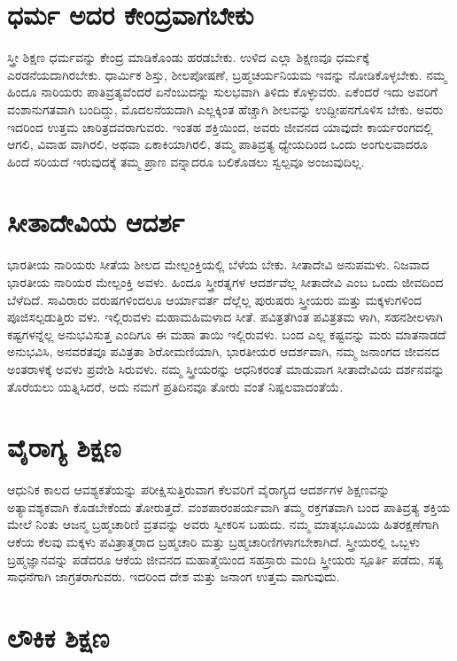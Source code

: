 \section{ಧರ್ಮ ಅದರ ಕೇಂದ್ರವಾಗಬೇಕು}

ಸ್ತ್ರೀ ಶಿಕ್ಷಣ ಧರ್ಮವನ್ನು ಕೇಂದ್ರ ಮಾಡಿಕೊಂಡು ಹರಡಬೇಕು. ಉಳಿದ ಎಲ್ಲಾ ಶಿಕ್ಷಣವೂ ಧರ್ಮಕ್ಕೆ ಎರಡನೆಯದಾಗಿರಬೇಕು. ಧಾರ್ಮಿಕ ಶಿಸ್ತು, ಶೀಲಪೋಷಣೆ, ಬ್ರಹ್ಮಚರ್ಯನಿಯಮ ಇವನ್ನು ನೋಡಿಕೊಳ್ಳಬೇಕು. ನಮ್ಮ ಹಿಂದೂ ನಾರಿಯರು ಪಾತಿವ್ರತ್ಯವೆಂದರೆ ಏನೆಂಬುದನ್ನು ಸುಲಭವಾಗಿ ತಿಳಿದು ಕೊಳ್ಳುವರು. ಏಕೆಂದರೆ ಇದು ಅವರಿಗೆ ವಂಶಾನುಗತವಾಗಿ ಬಂದಿದ್ದು, ಮೊದಲನೆಯದಾಗಿ ಎಲ್ಲಕ್ಕಿಂತ ಹೆಚ್ಚಾಗಿ ಶೀಲವನ್ನು ಉದ್ದೀಪನಗೊಳಿಸ ಬೇಕು. ಅವರು ಇದರಿಂದ ಉತ್ತಮ ಚಾರಿತ್ರದವರಾಗುವರು. ಇಂತಹ ಶಕ್ತಿಯಿಂದ, ಅವರು ಜೀವನದ ಯಾವುದೇ ಕಾರ್ಯರಂಗದಲ್ಲಿ ಆಗಲಿ, ವಿವಾಹ ವಾಗಿರಲಿ, ಅಥವಾ ಏಕಾಕಿಯಾಗಿರಲಿ, ತಮ್ಮ ಪಾತಿವ್ರತ್ಯ ಧ್ಯೇಯದಿಂದ ಒಂದು ಅಂಗುಲವಾದರೂ ಹಿಂದೆ ಸರಿಯದೆ ಇರುವುದಕ್ಕೆ ತಮ್ಮ ಪ್ರಾಣ ವನ್ನಾದರೂ ಬಲಿಕೊಡಲು ಸ್ವಲ್ಪವೂ ಅಂಜುವುದಿಲ್ಲ.


\section{ಸೀತಾದೇವಿಯ ಆದರ್ಶ}

ಭಾರತೀಯ ನಾರಿಯರು ಸೀತೆಯ ಶೀಲದ ಮೇಲ್ಪಂಕ್ತಿಯಲ್ಲಿ ಬೆಳೆಯ ಬೇಕು. ಸೀತಾದೇವಿ ಅನುಪಮಳು. ನಿಜವಾದ ಭಾರತೀಯ ನಾರಿಯರ ಮೇಲ್ಪಂಕ್ತಿ ಅವಳು. ಹಿಂದೂ ಸ್ತ್ರೀರತ್ನಗಳ ಆದರ್ಶವೆಲ್ಲ ಸೀತಾದೇವಿ ಎಂಬ ಒಂದು ಜೀವದಿಂದ ಬೆಳೆದಿದೆ. ಸಾವಿರಾರು ವರುಷಗಳಿಂದಲೂ ಆರ್ಯಾವರ್ತ ದೆಲ್ಲೆಲ್ಲ ಪುರುಷರು ಸ್ತ್ರೀಯರು ಮತ್ತು ಮಕ್ಕಳುಗಳಿಂದ ಪೂಜಿಸಲ್ಪಡುತ್ತಿರು ವಳು. ಇಲ್ಲಿರುವಳು ಮಹಾಮಹಿಮಳಾದ ಸೀತೆ. ಪವಿತ್ರತೆಗಿಂತ ಪವಿತ್ರತಮ ಳಾಗಿ, ಸಹನಶೀಲಳಾಗಿ ಕಷ್ಟಗಳನ್ನೆಲ್ಲ ಅನುಭವಿಸುತ್ತ ಎಂದಿಗೂ ಈ ಮಹಾ ತಾಯಿ ಇಲ್ಲಿರುವಳು. ಬಂದ ಎಲ್ಲ ಕಷ್ಟವನ್ನು ಮರು ಮಾತನಾಡದೆ ಅನುಭವಿಸಿ, ಅನವರತವೂ ಪವಿತ್ರತಾ ಶಿರೋಮಣಿಯಾಗಿ, ಭಾರತೀಯರ ಆದರ್ಶವಾಗಿ, ನಮ್ಮ ಜನಾಂಗದ ಜೀವನದ ಅಂತರಾಳಕ್ಕೆ ಅವಳು ಪ್ರವೇಶಿ ಸಿರುವಳು. ನಮ್ಮ ಸ್ತ್ರೀಯರನ್ನು ಆಧನಿಕರಂತೆ ಮಾಡುವಾಗ ಸೀತಾದೇವಿಯ ದರ್ಶನವನ್ನು ತೊರೆಯಲು ಯತ್ನಿಸಿದರೆ, ಅದು ನಮಗೆ ಪ್ರತಿದಿನವೂ ತೋರು ವಂತೆ ನಿಷ್ಪಲವಾದಂತೆಯೆ.


\section{ವೈರಾಗ್ಯ ಶಿಕ್ಷಣ}

ಆಧುನಿಕ ಕಾಲದ ಆವಶ್ಯಕತೆಯನ್ನು ಪರೀಕ್ಷಿಸುತ್ತಿರುವಾಗ ಕೆಲವರಿಗೆ ವೈರಾಗ್ಯದ ಆದರ್ಶಗಳ ಶಿಕ್ಷಣವನ್ನು ಅತ್ಯಾವಶ್ಯಕವಾಗಿ ಕೊಡಬೇಕೆಂದು ತೋರುತ್ತದೆ. ವಂಶಪಾರಂಪರ್ಯವಾಗಿ ತಮ್ಮ ರಕ್ತಗತವಾಗಿ ಬಂದ ಪಾತಿವ್ರತ್ಯ ಶಕ್ತಿಯ ಮೇಲೆ ನಿಂತು ಆಜನ್ಮ ಬ್ರಹ್ಮಚಾರಿಣಿ ವ್ರತವನ್ನು ಅವರು ಸ್ವೀಕರಿಸ ಬಹುದು. ನಮ್ಮ ಮಾತೃಭೂಮಿಯ ಹಿತರಕ್ಷಣೆಗಾಗಿ ಆಕೆಯ ಕೆಲವು ಮಕ್ಕಳು ಪವಿತ್ರಾತ್ಮರಾದ ಬ್ರಹ್ಮಚಾರಿ ಮತ್ತು ಬ್ರಹ್ಮಚಾರಿಣಿಗಳಾಗಬೇಕಾಗಿದೆ. ಸ್ತ್ರೀಯರಲ್ಲಿ ಒಬ್ಬಳು ಬ್ರಹ್ಮಜ್ಞಾನವನ್ನು ಪಡೆದರೂ ಆಕೆಯ ಜೀವನದ ಮಹಾತ್ಮೆಯಿಂದ ಸಹಸ್ರಾರು ಮಂದಿ ಸ್ತ್ರೀಯರು ಸ್ಪೂರ್ತಿ ಪಡೆದು, ಸತ್ಯ ಸಾಧನೆಗಾಗಿ ಜಾಗ್ರತರಾಗುವರು. ಇದರಿಂದ ದೇಶ ಮತ್ತು ಜನಾಂಗ ಉತ್ತಮ ವಾಗುವುದು.


\section{ಲೌಕಿಕ ಶಿಕ್ಷಣ}

